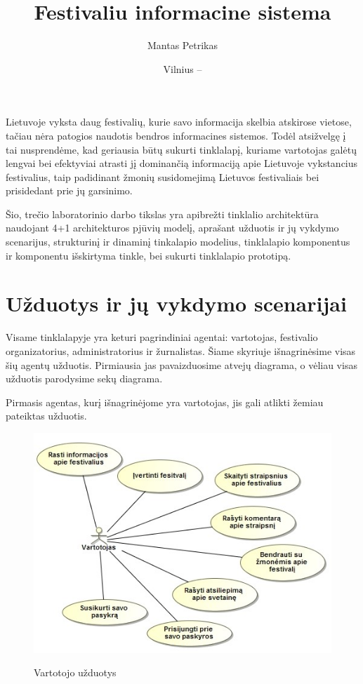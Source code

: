 ﻿\documentclass{VUMIFPSkursinis}
\title{Festivaliu informacine sistema}
\author{Mantas Petrikas}
\date{Vilnius – \the\year}
\begin{document}
\maketitle

\tableofcontents


Lietuvoje vyksta daug festivalių, kurie savo informacija skelbia atskirose vietose, tačiau nėra patogios naudotis bendros informacines sistemos. 
Todėl atsižvelgę į tai nusprendėme, kad geriausia būtų sukurti tinklalapį, kuriame vartotojas galėtų lengvai bei efektyviai atrasti jį dominančią informaciją apie Lietuvoje vykstancius festivalius, taip padidinant žmonių susidomejimą Lietuvos festivaliais bei prisidedant prie jų garsinimo.

Šio, trečio laboratorinio darbo tikslas yra apibrežti tinklalio architektūra naudojant 4+1 architekturos pjūvių modelį, aprašant užduotis ir jų vykdymo scenarijus, strukturinį ir dinaminį tinkalapio modelius, tinklalapio komponentus ir komponentu išskirtyma tinkle, bei sukurti tinklalapio prototipą.  

\section{Užduotys ir jų vykdymo scenarijai}
Visame tinklalapyje yra keturi pagrindiniai agentai: vartotojas, festivalio organizatorius, administratorius ir žurnalistas. Šiame skyriuje išnagrinėsime visas šių agentų užduotis. Pirmiausia jas pavaizduosime atvejų diagrama, o vėliau visas užduotis parodysime sekų diagrama. 

Pirmasis agentas, kurį išnagrinėjome yra vartotojas, jis gali atlikti žemiau pateiktas užduotis.

\begin{figure}[H]
    \centering
    \includegraphics[scale=0.5]{img/Pav/Vartotojas}
    \label{img:uml1}
	\caption{Vartotojo užduotys}
\end{figure}
\end{document}
